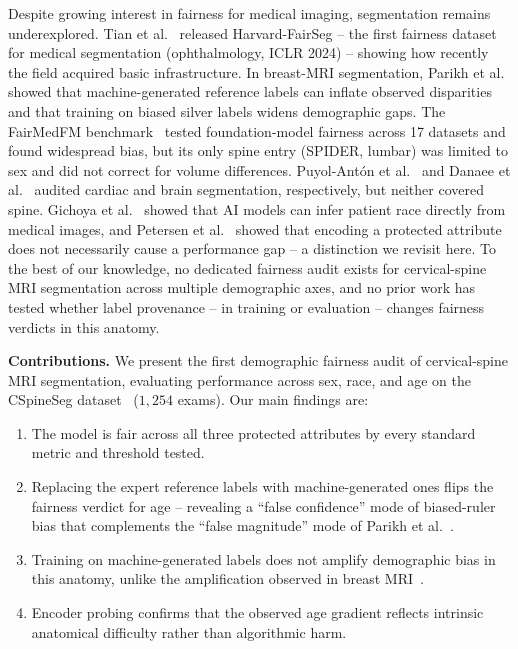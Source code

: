 Despite growing interest in fairness for medical imaging, segmentation remains
underexplored. Tian et al.~\cite{tian2024fairseg} released Harvard-FairSeg -- the
first fairness dataset for medical segmentation (ophthalmology, ICLR 2024) --
showing how recently the field acquired basic infrastructure. In breast-MRI
segmentation, Parikh et al.~\cite{parikh2025labelbias,parikh2025whofails} showed
that machine-generated reference labels can inflate observed disparities and that
training on biased silver labels widens demographic gaps. The FairMedFM
benchmark~\cite{jin2024fairmedfm} tested foundation-model fairness across 17
datasets and found widespread bias, but its only spine entry (SPIDER, lumbar) was
limited to sex and did not correct for volume differences. Puyol-Ant\'{o}n et
al.~\cite{puyolanton2021fairness} and Danaee et
al.~\cite{danaee2026brain} audited cardiac and brain segmentation,
respectively, but neither covered spine. Gichoya et
al.~\cite{gichoya2022reading} showed that AI models can infer patient race
directly from medical images, and Petersen et
al.~\cite{petersen2023feature} showed that encoding a protected attribute does not
necessarily cause a performance gap -- a distinction we revisit here. To the best of our knowledge,
no dedicated fairness audit exists for cervical-spine MRI segmentation
across multiple demographic axes, and no prior work has tested whether label
provenance -- in training or evaluation -- changes fairness verdicts in this
anatomy.

\smallskip\noindent\textbf{Contributions.}\enspace
We present the first demographic fairness audit of cervical-spine MRI
segmentation, evaluating performance across sex, race, and age on the CSpineSeg
dataset~\cite{zhou2025cspineseg} ($1{,}254$ exams). Our main findings are:
\begin{enumerate}
  \item The model is fair across all three protected attributes by every
    standard metric and threshold tested.
  \item Replacing the expert reference labels with machine-generated ones flips
    the fairness verdict for age -- revealing a ``false confidence'' mode
    of biased-ruler bias that complements the ``false magnitude'' mode of Parikh
    et al.~\cite{parikh2025labelbias}.
  \item Training on machine-generated labels does not amplify demographic bias in
    this anatomy, unlike the amplification observed in breast
    MRI~\cite{parikh2025labelbias}.
  \item Encoder probing confirms that the observed age gradient reflects
    intrinsic anatomical difficulty rather than algorithmic harm.
\end{enumerate}
